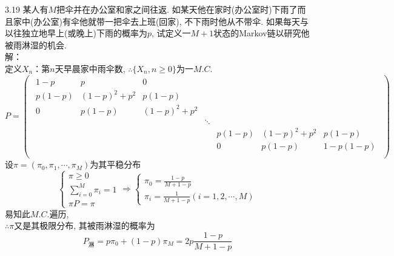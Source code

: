 3.19 某人有$M$把伞并在办公室和家之间往返. 如某天他在家时(办公室时)下雨了而且家中(办公室)有伞他就带一把伞去上班(回家), 不下雨时他从不带伞. 如果每天与以往独立地早上(或晚上)下雨的概率为$p$, 试定义一$M+1$状态的Markov链以研究他被雨淋湿的机会.\\
解：\\
定义$X_n$：第$n$天早晨家中雨伞数, $\therefore \{X_n, n \geqslant 0\}$为一$M.C.$\\
	\[
	P = 
	\begin{pmatrix}
	\begin{smallmatrix}
		1-p & p & 0 & ~ & ~ & ~ & ~\\
		p(1-p) & (1-p)^2+p^2 & p(1-p) & ~ & ~ & ~ & ~\\
		0 & p(1-p) & (1-p)^2+p^2 & ~ & ~ & ~ & ~\\
		~ & ~ & ~ & \ddots & ~ & ~ & ~\\
		~ & ~ & ~ & ~ & p(1-p) & (1-p)^2+p^2 & p(1-p)\\
		~ & ~ & ~ & ~ & 0 & p(1-p) & 1-p(1-p)\\
	\end{smallmatrix}
	\end{pmatrix}
	\]
	设$\pi = (\pi_0, \pi_1, \cdots, \pi_M)$为其平稳分布\\
	\[
	\begin{cases}
	\pi \geqslant 0\\
	\sum\limits^M_{i=0}\pi_i = 1\\
	\pi P = \pi
	\end{cases}
	\Rightarrow
	\begin{cases}
	\pi_0 = \frac{1-p}{M+1-p}\\
	\pi_i = \frac{1}{M+1-p} (i = 1,2,\cdots,M)
	\end{cases}
	\]
易知此$M.C.$遍历, \\
$\therefore \pi$又是其极限分布, 其被雨淋湿的概率为
\[
P_{\text{淋}} = p\pi_0+(1-p)\pi_M = 2p\frac{1-p}{M+1-p}
\]


